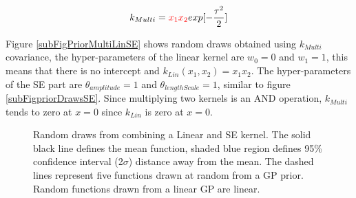 \begin{equation}\label{eqMultiLinSECovariance}
k_{Multi} = \textcolor{red}{x_{1}x_{2}} exp[- \frac{\tau^2}{2}]
\end{equation}

Figure \ref{subFigPriorMultiLinSE} shows random draws obtained using $k_{Multi}$ covariance,  the hyper-parameters of the linear kernel are $w_{0}=0$ and $w_{1}=1$, this means that there is no intercept and $k_{Lin}(x_{1}, x_{2}) = x_{1}x_{2}$. The hyper-parameters of the SE part are $\theta_{amplitude}=1$ and $\theta_{lengthScale}=1$, similar to figure \ref{subFigpriorDrawsSE}. Since multiplying two kernels is an AND operation, $k_{Multi}$ tends to zero at $x=0$ since $k_{Lin}$ is zero at $x=0$. 

\begin{figure}[!ht]
  \centering
    \quad
{}\quad

       \caption{Random draws from combining a Linear and SE kernel. The solid black line defines the mean function, shaded blue region defines 95\% confidence interval (2$\sigma$) distance away from the mean. The dashed lines represent five functions drawn at random from a GP prior. Random functions drawn from a linear GP are linear.}
       \label{figPrior}
\end{figure}


